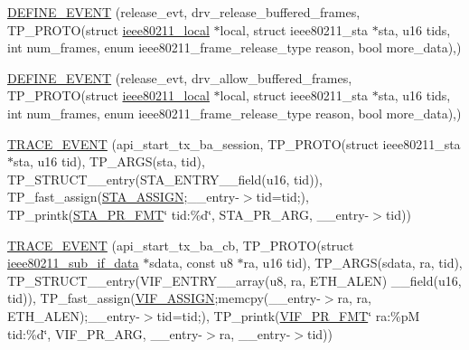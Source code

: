 \begin{DoxyCompactItemize}
\item 
\hyperlink{driver-trace_8h_ab5a0a16c9f012708f2b3367201a4a44a}{D\-E\-F\-I\-N\-E\-\_\-\-E\-V\-E\-N\-T} (release\-\_\-evt, drv\-\_\-release\-\_\-buffered\-\_\-frames, T\-P\-\_\-\-P\-R\-O\-T\-O(struct \hyperlink{structieee80211__local}{ieee80211\-\_\-local} $\ast$local, struct ieee80211\-\_\-sta $\ast$sta, u16 tids, int num\-\_\-frames, enum ieee80211\-\_\-frame\-\_\-release\-\_\-type reason, bool more\-\_\-data),)
\item 
\hyperlink{driver-trace_8h_a63d5a24aaee5e934697d4826747755f5}{D\-E\-F\-I\-N\-E\-\_\-\-E\-V\-E\-N\-T} (release\-\_\-evt, drv\-\_\-allow\-\_\-buffered\-\_\-frames, T\-P\-\_\-\-P\-R\-O\-T\-O(struct \hyperlink{structieee80211__local}{ieee80211\-\_\-local} $\ast$local, struct ieee80211\-\_\-sta $\ast$sta, u16 tids, int num\-\_\-frames, enum ieee80211\-\_\-frame\-\_\-release\-\_\-type reason, bool more\-\_\-data),)
\item 
\hyperlink{driver-trace_8h_a11b39de21ba24eb63ee9717802983b07}{T\-R\-A\-C\-E\-\_\-\-E\-V\-E\-N\-T} (api\-\_\-start\-\_\-tx\-\_\-ba\-\_\-session, T\-P\-\_\-\-P\-R\-O\-T\-O(struct ieee80211\-\_\-sta $\ast$sta, u16 tid), T\-P\-\_\-\-A\-R\-G\-S(sta, tid), T\-P\-\_\-\-S\-T\-R\-U\-C\-T\-\_\-\-\_\-entry(S\-T\-A\-\_\-\-E\-N\-T\-R\-Y\-\_\-\-\_\-field(u16, tid)), T\-P\-\_\-fast\-\_\-assign(\hyperlink{driver-trace_8h_abbd837b5fc444c0cb48b5954f8ad068a}{S\-T\-A\-\_\-\-A\-S\-S\-I\-G\-N};\-\_\-\-\_\-entry-\/$>$tid=tid;), T\-P\-\_\-printk(\hyperlink{driver-trace_8h_a73d0cd445b999888e3f21698b769c843}{S\-T\-A\-\_\-\-P\-R\-\_\-\-F\-M\-T}\char`\"{} tid\-:\%d\char`\"{}, S\-T\-A\-\_\-\-P\-R\-\_\-\-A\-R\-G, \-\_\-\-\_\-entry-\/$>$tid))
\item 
\hyperlink{driver-trace_8h_a180c624fc94c41ef80cfb88c353bffb0}{T\-R\-A\-C\-E\-\_\-\-E\-V\-E\-N\-T} (api\-\_\-start\-\_\-tx\-\_\-ba\-\_\-cb, T\-P\-\_\-\-P\-R\-O\-T\-O(struct \hyperlink{structieee80211__sub__if__data}{ieee80211\-\_\-sub\-\_\-if\-\_\-data} $\ast$sdata, const u8 $\ast$ra, u16 tid), T\-P\-\_\-\-A\-R\-G\-S(sdata, ra, tid), T\-P\-\_\-\-S\-T\-R\-U\-C\-T\-\_\-\-\_\-entry(V\-I\-F\-\_\-\-E\-N\-T\-R\-Y\-\_\-\-\_\-array(u8, ra, E\-T\-H\-\_\-\-A\-L\-E\-N) \-\_\-\-\_\-field(u16, tid)), T\-P\-\_\-fast\-\_\-assign(\hyperlink{driver-trace_8h_af5ede80f04ffcb3f644f68837b1d252c}{V\-I\-F\-\_\-\-A\-S\-S\-I\-G\-N};memcpy(\-\_\-\-\_\-entry-\/$>$ra, ra, E\-T\-H\-\_\-\-A\-L\-E\-N);\-\_\-\-\_\-entry-\/$>$tid=tid;), T\-P\-\_\-printk(\hyperlink{driver-trace_8h_a50711161ccfc99a73b43b988149a61a5}{V\-I\-F\-\_\-\-P\-R\-\_\-\-F\-M\-T}\char`\"{} ra\-:\%p\-M tid\-:\%d\char`\"{}, V\-I\-F\-\_\-\-P\-R\-\_\-\-A\-R\-G, \-\_\-\-\_\-entry-\/$>$ra, \-\_\-\-\_\-entry-\/$>$tid))

\end{DoxyCompactItemize}
